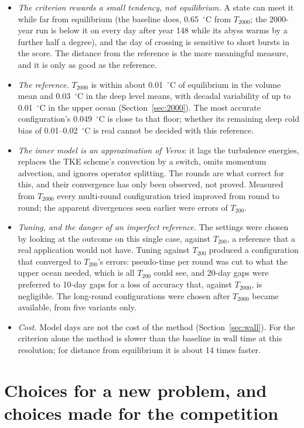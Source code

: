 \documentclass{article}
\begin{document}
\begin{itemize}
\item \emph{The criterion rewards a small tendency, not equilibrium.} A state can meet it while far from equilibrium (the baseline does, 0.65~$^\circ$C from $T_{2000}$; the 2000-year run is below it on every day after year 148 while its abyss warms by a further half a degree), and the day of crossing is sensitive to short bursts in the score. The distance from the reference is the more meaningful measure, and it is only as good as the reference.
\item \emph{The reference.} $T_{2000}$ is within about 0.01~$^\circ$C of equilibrium in the volume mean and 0.03~$^\circ$C in the deep level means, with decadal variability of up to 0.01~$^\circ$C in the upper ocean (Section~\ref{sec:2000}). The most accurate configuration's 0.049~$^\circ$C is close to that floor; whether its remaining deep cold bias of 0.01--0.02~$^\circ$C is real cannot be decided with this reference.
\item \emph{The inner model is an approximation of Veros}: it lags the turbulence energies, replaces the TKE scheme's convection by a switch, omits momentum advection, and ignores operator splitting. The rounds are what correct for this, and their convergence has only been observed, not proved. Measured from $T_{2000}$ every multi-round configuration tried improved from round to round; the apparent divergences seen earlier were errors of $T_{200}$.
\item \emph{Tuning, and the danger of an imperfect reference.} The settings were chosen by looking at the outcome on this single case, against $T_{200}$, a reference that a real application would not have. Tuning against $T_{200}$ produced a configuration that converged to $T_{200}$'s errors: pseudo-time per round was cut to what the upper ocean needed, which is all $T_{200}$ could see, and 20-day gaps were preferred to 10-day gaps for a loss of accuracy that, against $T_{2000}$, is negligible. The long-round configurations were chosen after $T_{2000}$ became available, from five variants only.
\item \emph{Cost.} Model days are not the cost of the method (Section~\ref{sec:wall}). For the criterion alone the method is slower than the baseline in wall time at this resolution; for distance from equilibrium it is about 14 times faster.
\end{itemize}

\section{Choices for a new problem, and choices made for the competition}\label{sec:choices}
\end{document}
